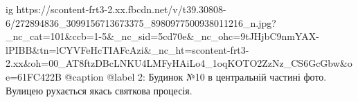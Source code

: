  
 
 
 
 

\ifcmt
  ig https://scontent-frt3-2.xx.fbcdn.net/v/t39.30808-6/272894836_3099156713673375_8980977500938011216_n.jpg?_nc_cat=101&ccb=1-5&_nc_sid=5cd70e&_nc_ohc=9tJHjbC9nmYAX-lPIBB&tn=lCYVFeHcTIAFcAzi&_nc_ht=scontent-frt3-2.xx&oh=00_AT8ftzDBcLNKU4LMFyHAiLo4_1oqKOTO2ZzNz_CS6GcGbw&oe=61FC422B
  @caption @label 2: Будинок №10 в центральній частині фото. Вулицею рухається якась святкова процесія.
\fi
